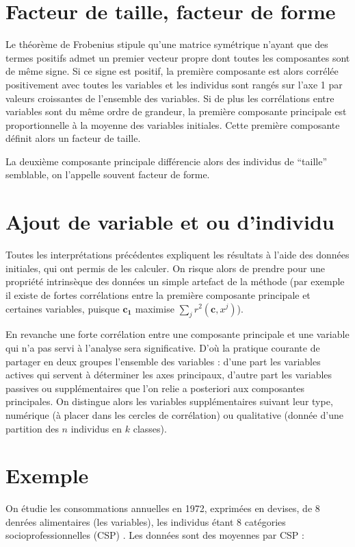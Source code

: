 \documentclass[letterpaper,10pt,english]{jupyterBook}
\begin{document}
\section{Facteur de taille, facteur de forme}
\label{\detokenize{acp:facteur-de-taille-facteur-de-forme}}
\sphinxAtStartPar
Le théorème de Frobenius stipule qu’une matrice symétrique n’ayant que des termes positifs admet un premier vecteur propre dont toutes les composantes sont de même signe. Si ce signe est positif, la première composante est alors corrélée positivement avec toutes les variables et les individus sont rangés sur l’axe 1 par valeurs croissantes de l’ensemble des variables. Si de plus les corrélations entre variables sont du même ordre de grandeur, la première composante principale est proportionnelle à la moyenne des variables initiales. Cette première composante définit alors un facteur de taille.

\sphinxAtStartPar
La deuxième composante principale différencie alors des individus de “taille” semblable, on l’appelle souvent facteur de forme.


\section{Ajout de variable et ou d’individu}
\label{\detokenize{acp:ajout-de-variable-et-ou-d-individu}}
\sphinxAtStartPar
Toutes les interprétations précédentes expliquent les résultats à l’aide des données initiales, qui ont permis de les calculer. On risque alors de prendre pour une propriété intrinsèque des données un simple artefact de la méthode (par exemple il existe de fortes corrélations entre la première composante principale et certaines variables, puisque \(\mathbf{c_1}\) maximise \(\sum_j r^2(\mathbf{c},x^j)\)).

\sphinxAtStartPar
En revanche une forte corrélation entre une composante principale et une variable qui n’a pas servi à l’analyse sera significative. D’où la pratique courante de partager en deux groupes l’ensemble des variables : d’une part les variables actives qui servent à déterminer les axes principaux, d’autre part les variables passives ou supplémentaires que l’on relie a posteriori aux composantes principales. On distingue alors les variables supplémentaires suivant leur type, numérique (à placer dans les cercles de corrélation) ou qualitative (donnée d’une partition des \(n\) individus en \(k\) classes).


\section{Exemple}
\label{\detokenize{acp:exemple}}
\sphinxAtStartPar
On étudie les consommations annuelles en 1972, exprimées en devises, de 8 denrées alimentaires (les variables), les individus étant 8 catégories socio\sphinxhyphen{}professionnelles (CSP) . Les données sont des moyennes par CSP :
\end{document}
